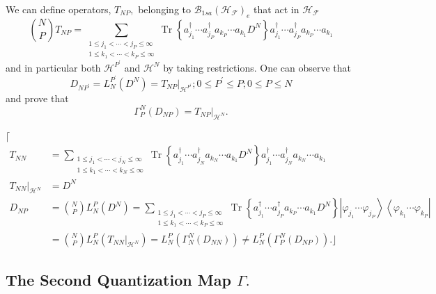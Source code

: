 \documentclass[aps,preprint]{revtex4}%
\begin{document}
We can define operators, $T_{NP},$ belonging to $\mathcal{B}_{1sa}\left(
\mathcal{H}_{\mathcal{F}}\right)  _{e}$ that act in $\mathcal{H}_{\mathcal{F}%
}$
\begin{equation}
\binom{N}{P}T_{NP}=\sum_{\substack{1\leq j_{1}<\cdots<j_{P}\leq\infty\\1\leq
k_{1}<\cdots<k_{P}\leq\infty}}\operatorname{Tr}\left\{  a_{j_{1}}^{\dagger
}\cdots a_{j_{P}}^{\dagger}a_{k_{P}}\cdots a_{k_{1}}D^{N}\right\}  a_{j_{1}%
}^{\dagger}\cdots a_{j_{P}}^{\dagger}a_{k_{P}}\cdots a_{k_{1}}%
\end{equation}
and in particular both $\mathcal{H}^{P^{\prime}}$ and $\mathcal{H}^{N}$ by
taking restrictions$.$ One can observe that
\begin{equation}
D_{NP^{\prime}}=L_{N}^{P^{\prime}}\left(  D^{N}\right)  =\left.
T_{NP}\right\vert _{\mathcal{H}^{P^{\prime}}};0\leq P^{\prime}\leq P;0\leq
P\leq N
\end{equation}
and prove that
\begin{equation}
\Gamma_{P}^{N}\left(  D_{NP}\right)  =\left.  T_{NP}\right\vert _{\mathcal{H}%
^{N}}.
\end{equation}


$\lceil$%
\begin{align}
T_{NN}  &  =\sum_{\substack{1\leq j_{1}<\cdots<j_{N}\leq\infty\\1\leq
k_{1}<\cdots<k_{N}\leq\infty}}\operatorname{Tr}\left\{  a_{j_{1}}^{\dagger
}\cdots a_{j_{N}}^{\dagger}a_{k_{N}}\cdots a_{k_{1}}D^{N}\right\}  a_{j_{1}%
}^{\dagger}\cdots a_{j_{N}}^{\dagger}a_{k_{N}}\cdots a_{k_{1}}\nonumber\\
\left.  T_{NN}\right\vert _{\mathcal{H}^{N}}  &  =D^{N}\nonumber\\
D_{NP}  &  =\binom{N}{P}L_{N}^{P}\left(  D^{N}\right)  =\sum_{\substack{1\leq
j_{1}<\cdots<j_{P}\leq\infty\\1\leq k_{1}<\cdots<k_{P}\leq\infty
}}\operatorname{Tr}\left\{  a_{j_{1}}^{\dagger}\cdots a_{j_{P}}^{\dagger
}a_{k_{P}}\cdots a_{k_{1}}D^{N}\right\}  \left\vert \varphi_{j_{1}}%
\cdots\varphi_{j_{P}}\right\rangle \left\langle \varphi_{k_{1}}\cdots
\varphi_{k_{P}}\right\vert \nonumber\\
&  =\binom{N}{P}L_{N}^{P}\left(  \left.  T_{NN}\right\vert _{\mathcal{H}^{N}%
}\right)  =L_{N}^{P}\left(  \Gamma_{N}^{N}\left(  D_{NN}\right)  \right)  \neq
L_{N}^{P}\left(  \Gamma_{P}^{N}\left(  D_{NP}\right)  \right)  .\rfloor
\end{align}


\subsection{The Second Quantization Map $\Gamma.\label{SeCQuant}$}
\end{document}

